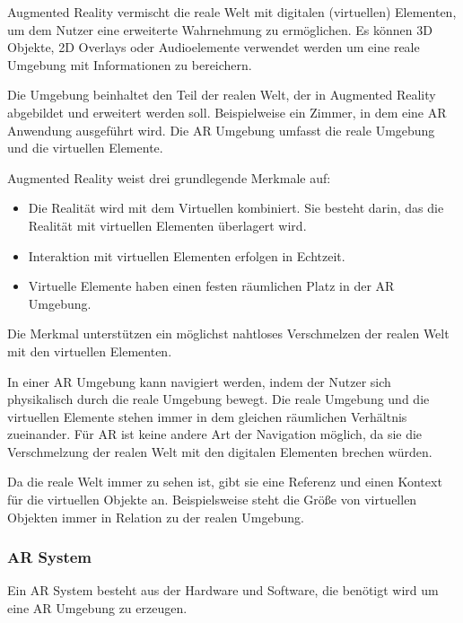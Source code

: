 Augmented Reality vermischt die reale Welt mit digitalen (virtuellen) Elementen, um dem Nutzer eine erweiterte Wahrnehmung zu ermöglichen. Es können 3D Objekte, 2D Overlays oder Audioelemente verwendet werden um eine reale Umgebung mit Informationen zu bereichern. 

Die Umgebung beinhaltet den Teil der realen Welt, der in Augmented Reality abgebildet und erweitert werden soll. Beispielweise ein Zimmer, in dem eine AR Anwendung ausgeführt wird.
Die AR Umgebung umfasst die reale Umgebung und die virtuellen Elemente.

Augmented Reality weist drei grundlegende Merkmale auf: 
\begin{itemize}
	\item Die Realität wird mit dem Virtuellen kombiniert. Sie besteht darin, das die Realität mit virtuellen Elementen überlagert wird.
	\item Interaktion mit virtuellen Elementen erfolgen in Echtzeit.
	\item Virtuelle Elemente haben einen festen räumlichen Platz in der AR Umgebung.
\end{itemize}

Die Merkmal unterstützen ein möglichst nahtloses Verschmelzen der realen Welt mit den virtuellen Elementen.

In einer AR Umgebung kann navigiert werden, indem der Nutzer sich physikalisch durch die reale Umgebung bewegt. Die reale Umgebung und die virtuellen Elemente stehen immer in dem gleichen räumlichen Verhältnis zueinander. Für AR ist keine andere Art der Navigation möglich, da sie die Verschmelzung der realen Welt mit den digitalen Elementen brechen würden.

Da die reale Welt immer zu sehen ist, gibt sie eine Referenz und einen Kontext für die virtuellen Objekte an. 
Beispielsweise steht die Größe von virtuellen Objekten immer in Relation zu der realen Umgebung.\citep{GrundlagenAR}


\subsubsection{AR System}

Ein AR System besteht aus der Hardware und Software, die benötigt wird um eine AR Umgebung zu erzeugen.

